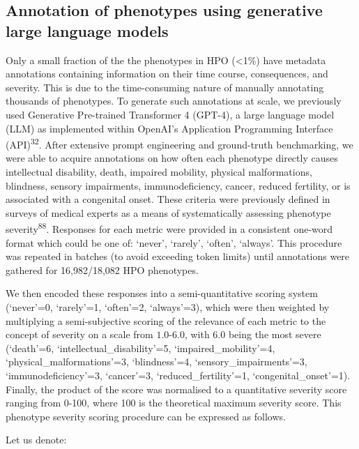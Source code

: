 \documentclass[
]{report}
\begin{document}
\subsection{Annotation of phenotypes using generative large language
models}\label{annotation-of-phenotypes-using-generative-large-language-models-1}

Only a small fraction of the the phenotypes in HPO (\textless1\%) have
metadata annotations containing information on their time course,
consequences, and severity. This is due to the time-consuming nature of
manually annotating thousands of phenotypes. To generate such
annotations at scale, we previously used Generative Pre-trained
Transformer 4 (GPT-4), a large language model (LLM) as implemented
within OpenAI's Application Programming Interface
(API)\textsuperscript{32}. After extensive prompt engineering and
ground-truth benchmarking, we were able to acquire annotations on how
often each phenotype directly causes intellectual disability, death,
impaired mobility, physical malformations, blindness, sensory
impairments, immunodeficiency, cancer, reduced fertility, or is
associated with a congenital onset. These criteria were previously
defined in surveys of medical experts as a means of systematically
assessing phenotype severity\textsuperscript{88}. Responses for each
metric were provided in a consistent one-word format which could be one
of: `never', `rarely', `often', `always'. This procedure was repeated in
batches (to avoid exceeding token limits) until annotations were
gathered for 16,982/18,082 HPO phenotypes.

We then encoded these responses into a semi-quantitative scoring system
(`never'=0, `rarely'=1, `often'=2, `always'=3), which were then weighted
by multiplying a semi-subjective scoring of the relevance of each metric
to the concept of severity on a scale from \(1.0\)-\(6.0\), with \(6.0\)
being the most severe (`death'=6, `intellectual\_disability'=5,
`impaired\_mobility'=4, `physical\_malformations'=3, `blindness'=4,
`sensory\_impairments'=3, `immunodeficiency'=3, `cancer'=3,
`reduced\_fertility'=1, `congenital\_onset'=1). Finally, the product of
the score was normalised to a quantitative severity score ranging from
0-100, where 100 is the theoretical maximum severity score. This
phenotype severity scoring procedure can be expressed as follows.

Let us denote:
\end{document}

